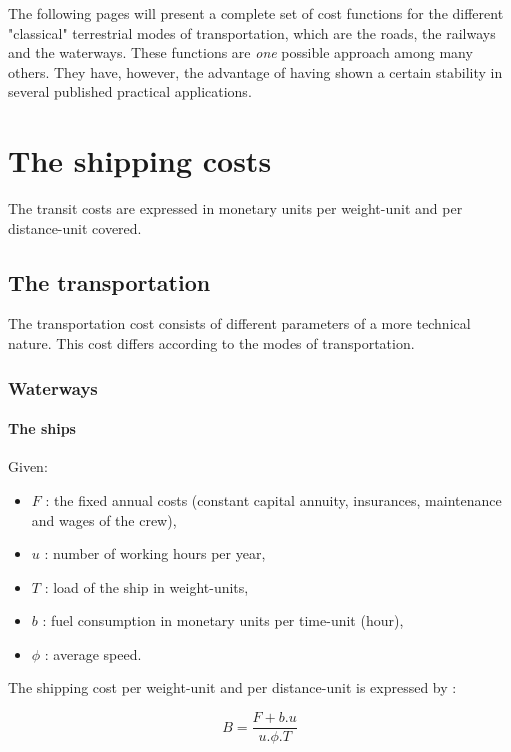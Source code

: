 
The following pages will present a complete set of cost functions for the
different "classical" terrestrial modes of transportation, which are the roads,
the railways and the waterways.  These functions are {\it one} possible approach
among many others.  They have, however, the advantage of having shown a certain
stability in several published practical applications.



\section{The shipping costs}

The transit costs are expressed in monetary units per weight-unit and per distance-unit covered.



\subsection{The transportation}

The transportation cost consists of different parameters of a more technical
nature.  This cost differs according to the modes of transportation.

\subsubsection{Waterways}

\paragraph{The ships}

Given:

\begin{itemize}
\item $F$ : the fixed annual costs (constant capital annuity, insurances, maintenance and
wages of the crew),
\item $u$ : number of working hours per year,
\item $T$ : load of the ship in weight-units,
\item $b$ : fuel consumption in monetary units per time-unit (hour),
\item $\phi$ :  average speed.
\end{itemize}

The shipping cost per weight-unit and per distance-unit is expressed by :

$$ B = \frac{F+b.u}{u.\phi . T}$$




